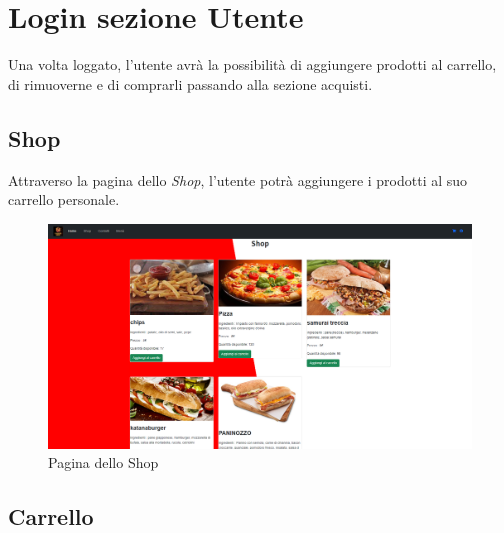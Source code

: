 \documentclass[a4paper,12pt]{report}
\begin{document}
	
	\newpage
	
	\section{Login sezione Utente}
	
	\textsf{\small Una volta loggato, l'utente avrà la possibilità di aggiungere prodotti al carrello, di rimuoverne e di comprarli passando alla sezione acquisti.}\\
	
	
	\subsection{Shop}
	
	\textsf{\small Attraverso la pagina dello \emph{Shop}, l'utente potrà aggiungere i prodotti al suo carrello personale.}\\
	
	\begin{figure}[H] 
		\centering
		\includegraphics[width=1\textwidth, height=1\textheight, keepaspectratio]{./Images/Shop.png}
		\caption{Pagina dello Shop}
		\label{fig:Shop}
	\end{figure}
	
	
	\newpage
	
	\subsection{Carrello}
	
\end{document}
